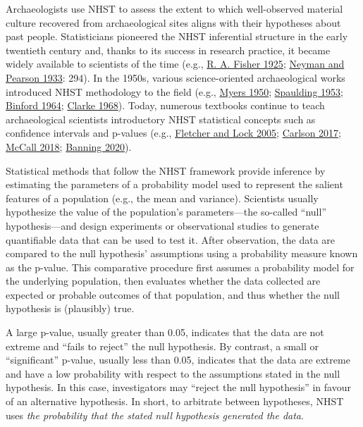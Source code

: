 \documentclass[
]{article}
\begin{document}
Archaeologists use NHST to assess the extent to which well-observed
material culture recovered from archaeological sites aligns with their
hypotheses about past people. Statisticians pioneered the NHST
inferential structure in the early twentieth century and, thanks to its
success in research practice, it became widely available to scientists
of the time (e.g., \protect\hyperlink{ref-fisher_statistical_1925}{R. A.
Fisher 1925}; \protect\hyperlink{ref-neyman_problem_1933}{Neyman and
Pearson 1933}: 294). In the 1950s, various science-oriented
archaeological works introduced NHST methodology to the field (e.g.,
\protect\hyperlink{ref-myers_applications_1950}{Myers 1950};
\protect\hyperlink{ref-spaulding_statistical_1953}{Spaulding 1953};
\protect\hyperlink{ref-binford_consideration_1964}{Binford 1964};
\protect\hyperlink{ref-clarke_analytical_1968}{Clarke 1968}). Today,
numerous textbooks continue to teach archaeological scientists
introductory NHST statistical concepts such as confidence intervals and
p-values (e.g., \protect\hyperlink{ref-fletcher_digging_2005}{Fletcher
and Lock 2005};
\protect\hyperlink{ref-carlson_quantitative_2017}{Carlson 2017};
\protect\hyperlink{ref-mccall_strategies_2018}{McCall 2018};
\protect\hyperlink{ref-banning_archaeologists_2020}{Banning 2020}).

Statistical methods that follow the NHST framework provide inference by
estimating the parameters of a probability model used to represent the
salient features of a population (e.g., the mean and variance).
Scientists usually hypothesize the value of the population's
parameters---the so-called ``null'' hypothesis---and design experiments
or observational studies to generate quantifiable data that can be used
to test it. After observation, the data are compared to the null
hypothesis' assumptions using a probability measure known as the
p-value. This comparative procedure first assumes a probability model
for the underlying population, then evaluates whether the data collected
are expected or probable outcomes of that population, and thus whether
the null hypothesis is (plausibly) true.

A large p-value, usually greater than 0.05, indicates that the data are
not extreme and ``fails to reject'' the null hypothesis. By contrast, a
small or ``significant'' p-value, usually less than 0.05, indicates that
the data are extreme and have a low probability with respect to the
assumptions stated in the null hypothesis. In this case, investigators
may ``reject the null hypothesis'' in favour of an alternative
hypothesis. In short, to arbitrate between hypotheses, NHST uses
\emph{the probability that the stated null hypothesis generated the
data}.
\end{document}
